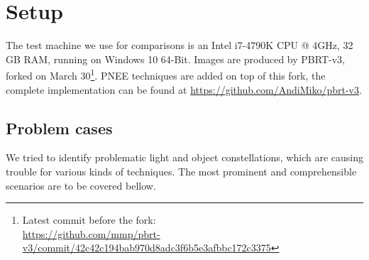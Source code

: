 \section{Setup}

The test machine we use for comparisons is an Intel i7-4790K CPU @ 4GHz, 32 GB RAM, running on Windows 10 64-Bit. Images are produced by PBRT-v3, forked on March 30\footnote{Latest commit before the fork: \\ \url{https://github.com/mmp/pbrt-v3/commit/42c42c194bab970d8adc3f6b5e3afbbc172c3375}}. PNEE techniques are added on top of this fork, the complete implementation can be found at \url{https://github.com/AndiMiko/pbrt-v3}.

\subsection{Problem cases}

We tried to identify problematic light and object constellations, which are causing trouble for various kinds of techniques. The most prominent and comprehensible scenarios are to be covered bellow. 

